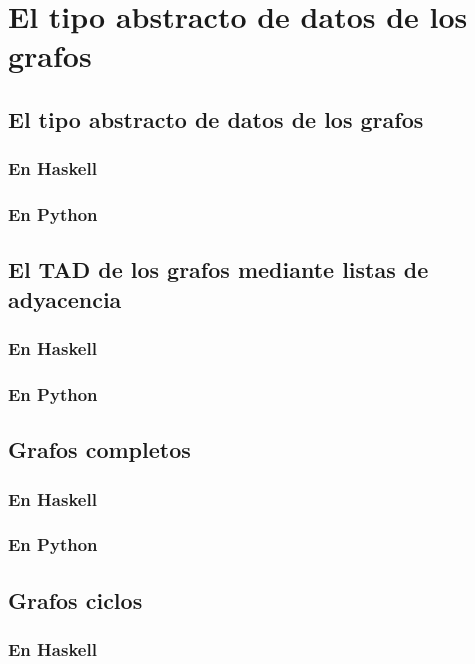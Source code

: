 \documentclass[a4paper,12pt,twoside]{book}
\begin{document}
\chapter{El tipo abstracto de datos de los grafos}

\minitoc

\section{El tipo abstracto de datos de los grafos}
\subsection{En Haskell}
\subsection{En Python}

\section{El TAD de los grafos mediante listas de adyacencia}
\subsection{En Haskell}
\subsection{En Python}

\section{Grafos completos}
\subsection{En Haskell}
\subsection{En Python}

\section{Grafos ciclos}
\subsection{En Haskell}
\end{document}

